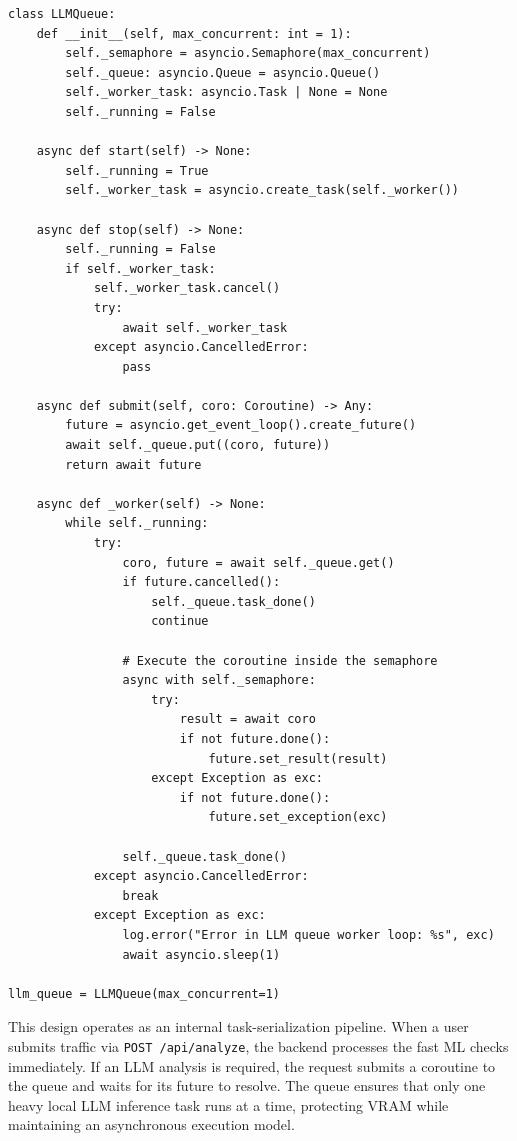 \documentclass[12pt,a4paper]{report}
\begin{document}
\begin{lstlisting}[style=pythonstyle, caption={Internal LLM Queue implementation with semaphore control}]
class LLMQueue:
    def __init__(self, max_concurrent: int = 1):
        self._semaphore = asyncio.Semaphore(max_concurrent)
        self._queue: asyncio.Queue = asyncio.Queue()
        self._worker_task: asyncio.Task | None = None
        self._running = False

    async def start(self) -> None:
        self._running = True
        self._worker_task = asyncio.create_task(self._worker())

    async def stop(self) -> None:
        self._running = False
        if self._worker_task:
            self._worker_task.cancel()
            try:
                await self._worker_task
            except asyncio.CancelledError:
                pass

    async def submit(self, coro: Coroutine) -> Any:
        future = asyncio.get_event_loop().create_future()
        await self._queue.put((coro, future))
        return await future

    async def _worker(self) -> None:
        while self._running:
            try:
                coro, future = await self._queue.get()
                if future.cancelled():
                    self._queue.task_done()
                    continue
                
                # Execute the coroutine inside the semaphore
                async with self._semaphore:
                    try:
                        result = await coro
                        if not future.done():
                            future.set_result(result)
                    except Exception as exc:
                        if not future.done():
                            future.set_exception(exc)
                
                self._queue.task_done()
            except asyncio.CancelledError:
                break
            except Exception as exc:
                log.error("Error in LLM queue worker loop: %s", exc)
                await asyncio.sleep(1)

llm_queue = LLMQueue(max_concurrent=1)
\end{lstlisting}

This design operates as an internal task-serialization pipeline. When a user submits traffic via \texttt{POST /api/analyze}, the backend processes the fast ML checks immediately. If an LLM analysis is required, the request submits a coroutine to the queue and waits for its future to resolve. The queue ensures that only one heavy local LLM inference task runs at a time, protecting VRAM while maintaining an asynchronous execution model.
\end{document}
